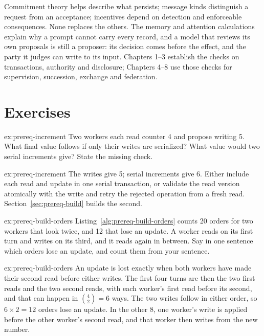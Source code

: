 Commitment theory helps describe what persists; message kinds distinguish a
request from an acceptance; incentives depend on detection and enforceable
consequences. None replaces the others. The memory and attention calculations
explain why a prompt cannot carry every record, and a model
that reviews its own proposals is still a proposer: its decision comes before
the effect, and the party it judges can write to its input. Chapters 1--3 establish the
checks on transactions, authority and disclosure; Chapters 4--8 use those
checks for supervision, succession, exchange and federation.

\section{Exercises}
\begin{pdexercise}[kind=Check,rating=1]{ex:prereq-increment}
Two workers each read counter 4 and propose writing 5. What final value follows
if only their writes are serialized? What value would two serial increments
give? State the missing check.
\end{pdexercise}
\begin{pdsolution}{ex:prereq-increment}
The writes give 5; serial increments give 6. Either include each read and update
in one serial transaction, or validate the read version atomically with the
write and retry the rejected operation from a fresh read.
Section~\ref{sec:prereq-build} builds the second.
\end{pdsolution}

\begin{pdexercise}[kind=Check,rating=1]{ex:prereq-build-orders}
Listing~\ref{alg:prereq-build-orders} counts 20 orders for two workers that
look twice, and 12 that lose an update. A worker reads on its first turn and
writes on its third, and it reads again in between. Say in one sentence which
orders lose an update, and count them from your sentence.
\end{pdexercise}
\begin{pdsolution}{ex:prereq-build-orders}
An update is lost exactly when both workers have made their second read
before either writes. The first four turns are then the two first reads and
the two second reads, with each worker's first read before its second, and
that can happen in $\binom{4}{2}=6$ ways. The two writes follow in either
order, so $6\times2=12$ orders lose an update. In the other 8, one worker's
write is applied before the other worker's second read, and that worker
then writes from the new number.
\end{pdsolution}

